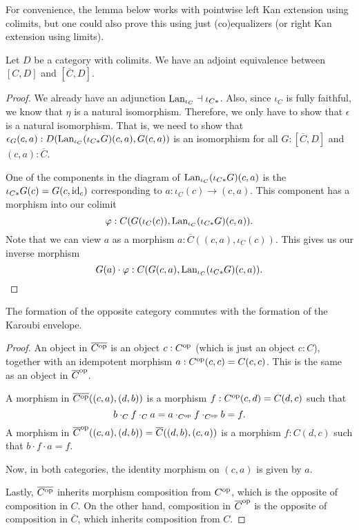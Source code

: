 For convenience, the lemma below works with pointwise left Kan extension using colimits, but one could also prove this using just (co)equalizers (or right Kan extension using limits).
\begin{lemma}
  Let $ D $ be a category with colimits. We have an adjoint equivalence between $ [C, D] $ and $ [\overline C, D] $.
\end{lemma}
\begin{proof}
  We already have an adjunction $ \text{Lan}_{\iota_C} \dashv \iota_{C*} $. Also, since $ \iota_C $ is fully faithful, we know that $ \eta $ is a natural isomorphism. Therefore, we only have to show that $ \epsilon $ is a natural isomorphism. That is, we need to show that $ \epsilon_G(c, a): D(\text{Lan}_{\iota_C}(\iota_{C*} G) (c, a), G(c, a)) $ is an isomorphism for all $ G: [\overline C, D] $ and $ (c, a): \overline C $.

  One of the components in the diagram of $ \text{Lan}_{\iota_C}(\iota_{C*} G) (c, a) $ is the $ \iota_{C*} G(c) = G(c, \text{id}_{c}) $ corresponding to $ a: \iota_C(c) \to (c, a) $. This component has a morphism into our colimit
  \[ \varphi: C(G(\iota_C(c)), \text{Lan}_{\iota_C}(\iota_{C*} G) (c, a)). \]
  Note that we can view $ a $ as a morphism $ a: \overline C((c, a), \iota_C(c)) $. This gives us our inverse morphism
  \[ G(a) \cdot \varphi: C(G(c, a), \text{Lan}_{\iota_C}(\iota_{C*} G) (c, a)). \]
\end{proof}

\begin{lemma}
  The formation of the opposite category commutes with the formation of the Karoubi envelope.
\end{lemma}
\begin{proof}
  An object in $ \overline{C^{\text{op}}} $ is an object $ c: C^{\text{op}} $ (which is just an object $ c: C $), together with an idempotent morphism $ a: C^{\text{op}}(c, c) = C(c, c) $. This is the same as an object in $ \overline C^{\text{op}} $.

  A morphism in $ \overline{C^{\text{op}}}((c, a), (d, b)) $ is a morphism $ f: C^{\text{op}}(c, d) = C(d, c) $ such that
  \[ b \cdot_C f \cdot_C a = a \cdot_{C^{\text{op}}} f \cdot_{C^{\text{op}}} b = f. \]
  A morphism in $ \overline C^{\text{op}}((c, a), (d, b)) = \overline C((d, b), (c, a)) $ is a morphism $ f: C(d, c) $ such that $ b \cdot f \cdot a = f $.

  Now, in both categories, the identity morphism on $ (c, a) $ is given by $ a $.

  Lastly, $ \overline {C^{\text{op}}} $ inherits morphism composition from $ C^{\text{op}} $, which is the opposite of composition in $ C $. On the other hand, composition in $ \overline C^{\text{op}} $ is the opposite of composition in $ \overline C $, which inherits composition from $ C $.
\end{proof}

